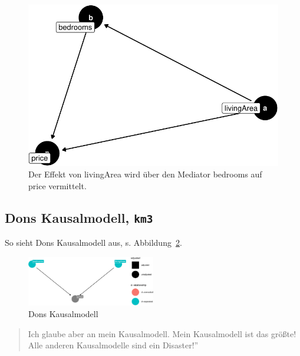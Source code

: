 \documentclass[
  a4paper,
  DIV=11]{scrreprt}
\theoremstyle{definition}
\theoremstyle{remark}
\begin{document}
\begin{figure}

{\centering \includegraphics{./kausal_files/figure-pdf/fig-m1-mediation-1.pdf}

}

\caption{\label{fig-m1-mediation}Der Effekt von livingArea wird über den
Mediator bedrooms auf price vermittelt.}

\end{figure}

\hypertarget{dons-kausalmodell-km3}{%
\subsection{\texorpdfstring{Dons Kausalmodell,
\texttt{km3}}{Dons Kausalmodell, km3}}\label{dons-kausalmodell-km3}}

So sieht Dons Kausalmodell aus, s. Abbildung~\ref{fig-km3}.

\begin{figure}

{\centering \includegraphics[width=0.5\textwidth,height=\textheight]{./kausal_files/figure-pdf/fig-km3-1.pdf}

}

\caption{\label{fig-km3}Dons Kausalmodell}

\end{figure}

\begin{quote}
Ich glaube aber an mein Kausalmodell. Mein Kausalmodell ist das größte!
Alle anderen Kausalmodelle sind ein Disaster!''
\end{quote}
\end{document}
